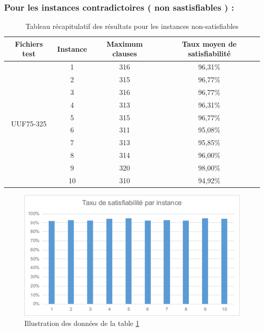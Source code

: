 \subsubsection{Pour les instances contradictoires ( non sastisfiables ) :  }
\begin{table}[H]
	\centering
	\begin{tabular}{|c|c|c|c|}
		\hline
		Fichiers test               & Instance & Maximum clauses & Taux moyen de satisfiabilité \\ \hline
		\multirow{10}{*}{UUF75-325} & 1        & 316             & 96,31\%                      \\ \cline{2-4} 
		& 2        & 315             & 96,77\%                      \\ \cline{2-4} 
		& 3        & 316             & 96,77\%                      \\ \cline{2-4} 
		& 4        & 313             & 96,31\%                      \\ \cline{2-4} 
		& 5        & 315             & 96,77\%                      \\ \cline{2-4} 
		& 6        & 311             & 95,08\%                      \\ \cline{2-4} 
		& 7        & 313             & 95,85\%                      \\ \cline{2-4} 
		& 8        & 314             & 96,00\%                      \\ \cline{2-4} 
		& 9        & 320             & 98,00\%                      \\ \cline{2-4} 
		& 10       & 310             & 94,92\%                      \\ \hline
	\end{tabular}
	\caption{Tableau récapitulatif des résultats pour les instances non-satisfiables}
	\label{table:Tab_Greedy_Non_Sat}
\end{table}
\begin{figure}[H]
	\includegraphics[width=\textwidth]{images/UniformCostUUF75Graph.png}
	\caption{Illustration des données de la table \ref{table:Tab_Greedy_Non_Sat}}
\end{figure}


